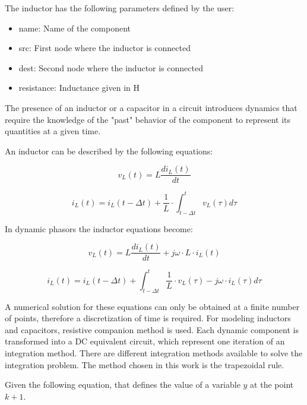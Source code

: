 The inductor has the following parameters defined by the user:

\begin{itemize}
\item name: Name of the component
\item src: First node where the inductor is connected
\item dest: Second node where the inductor is connected
\item resistance: Inductance given in H
\end{itemize}

The presence of an inductor or a capacitor in a circuit introduces dynamics that require the knowledge of the "past" behavior of the component to represent its quantities at a given time.

An inductor can be described by the following equations: 

\begin{equation}
        v_L(t) = L \frac{di_L(t)}{dt}
\end{equation}

\begin{equation}
        i_L(t) = i_L(t- \Delta t) + \frac{1}{L} \cdot \int_{t- \Delta t}^{t} v_L(\tau) d \tau 
\end{equation}

In dynamic phasors the inductor equations become:

\begin{equation}
        v_L(t) = L \frac{di_L(t)}{dt} + j \omega \cdot L \cdot  i_L(t)
\end{equation}

\begin{equation}
        i_L(t) = i_L(t- \Delta t) +  \int_{t- \Delta t}^{t} \frac{1}{L} \cdot v_L(\tau) -j \omega \cdot i_L(\tau)d \tau 
\end{equation}

A numerical solution for these equations can only be obtained at a finite number of points, therefore a discretization of time is required.
For modeling inductors and capacitors, resistive companion method is used. Each dynamic component is transformed into a DC equivalent circuit, which represent one iteration of an integration method.
There are different integration methods available to solve the integration problem. The method chosen in this work is the trapezoidal rule.

Given the following equation, that defines the value of a variable $y$ at the point $k+1$.

